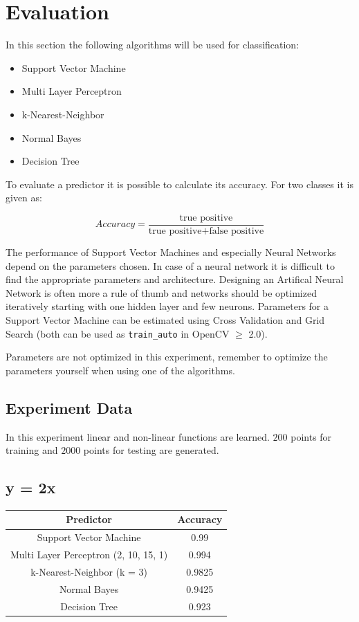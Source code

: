 \section{Evaluation}
In this section the following algorithms will be used for classification:
\begin{itemize}
 \item Support Vector Machine
 \item Multi Layer Perceptron
 \item k-Nearest-Neighbor
 \item Normal Bayes
 \item Decision Tree
\end{itemize}

To evaluate a predictor it is possible to calculate its accuracy. For two classes it is given as:

$$Accuracy = \frac{\mbox{true positive}}{\mbox{true positive} + \mbox{false positive}}$$

The performance of Support Vector Machines and especially Neural Networks depend on the parameters chosen. In case of a neural network it is difficult to find the appropriate parameters and architecture. Designing an Artifical Neural Network is often more a rule of thumb and networks should be optimized iteratively starting with one hidden layer and few neurons. Parameters for a Support Vector Machine can be estimated using Cross Validation and Grid Search (both can be used as \lstinline|train_auto| in OpenCV $\geq$ 2.0).
 
Parameters are not optimized in this experiment, remember to optimize the parameters yourself when using one of the algorithms.

\subsection{Experiment Data}
In this experiment linear and non-linear functions are learned. $200$ points for training and $2000$ points for testing are generated.

\subsection{y = 2x}

\begin{center}
\begin{tabular}{|c|c|}
\hline
Predictor &	 Accuracy\\ \hline\hline
Support Vector Machine &	0.99\\ \hline
Multi Layer Perceptron (2, 10, 15, 1) & 0.994\\ \hline
k-Nearest-Neighbor (k = 3) & 0.9825\\ \hline
Normal Bayes &	0.9425 \\ \hline
Decision Tree &	0.923\\ \hline
\end{tabular}
\end{center}

